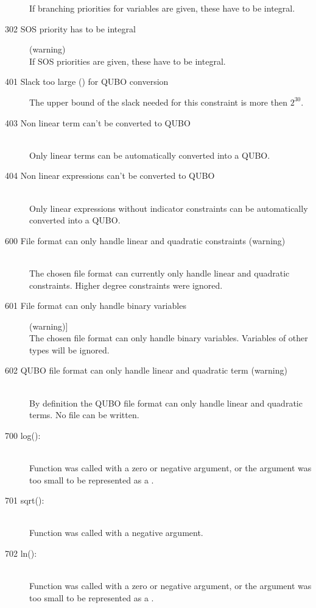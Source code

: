 \begin{description}
   If branching priorities for variables are given, these have to be integral.
\item[302 SOS priority has to be integral] (warning)\ \\
   If SOS priorities are given, these have to be integral.
\item [401 Slack too large (\code{xxx}) for QUBO conversion]
   The upper bound of the slack needed for this constraint is more then
   $2^{30}$.   
\item [403 Non linear term can't be converted to QUBO]\ \\
  Only linear terms can be automatically converted into a QUBO.
\item [404 Non linear expressions can't be converted to QUBO]\ \\
  Only linear expressions without indicator constraints can be
  automatically converted into a QUBO. 
\item[600 File format can only handle linear and quadratic constraints
         (warning)]\ \\
  The chosen file format can currently only handle linear and
  quadratic constraints. Higher degree constraints were ignored.
\item[601 File format can only handle binary variables] (warning)]\ \\
  The chosen file format can only handle binary variables. 
  Variables of other types will be ignored.
\item[602 QUBO file format can only handle linear and quadratic term
         (warning)]\ \\
  By definition the QUBO file format can only handle linear and
  quadratic terms. No file can be written.
%
%
% 
%
\item[700 log(): \code{OS specific domain or range error message}]\ \\
  Function  was called with a zero or negative argument, or
the argument was too small to be represented as a .
\item[701 sqrt(): \code{OS specific domain error message}]\ \\
  Function  was called with a negative argument.
\item[702 ln(): \code{OS specific domain or range error message}]\ \\
  Function  was called with a zero or negative argument, or
  the argument was too small to be represented as a .

\end{description}
